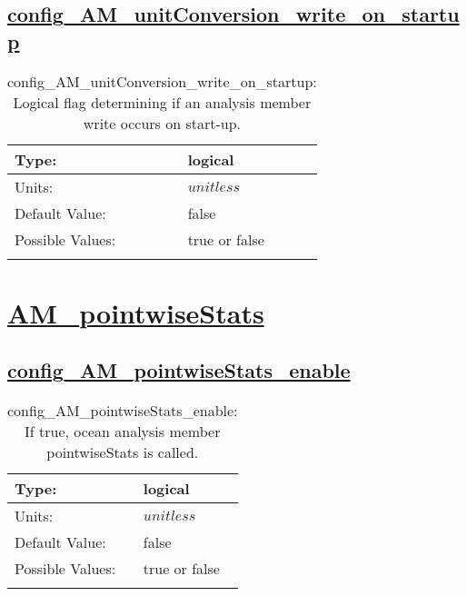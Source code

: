 \subsection[config\_AM\_unitConversion\_write\_on\_startup]{\hyperref[sec:nm_tab_AM_unitConversion]{config\_AM\_unitConversion\_write\_on\_startup}}
\label{subsec:nm_sec_config_AM_unitConversion_write_on_startup}
\begin{center}
\begin{longtable}{| p{2.0in} || p{4.0in} |}
    \hline
    Type: & logical \\
    \hline
    Units: & $unitless$ \\
    \hline
    Default Value: & false \\
    \hline
    Possible Values: & true or false \\
    \hline
    \caption{config\_AM\_unitConversion\_write\_on\_startup: Logical flag determining if an analysis member write occurs on start-up.}
\end{longtable}
\end{center}
\section[AM\_pointwiseStats]{\hyperref[sec:nm_tab_AM_pointwiseStats]{AM\_pointwiseStats}}
\label{sec:nm_sec_AM_pointwiseStats}
\subsection[config\_AM\_pointwiseStats\_enable]{\hyperref[sec:nm_tab_AM_pointwiseStats]{config\_AM\_pointwiseStats\_enable}}
\label{subsec:nm_sec_config_AM_pointwiseStats_enable}
\begin{center}
\begin{longtable}{| p{2.0in} || p{4.0in} |}
    \hline
    Type: & logical \\
    \hline
    Units: & $unitless$ \\
    \hline
    Default Value: & false \\
    \hline
    Possible Values: & true or false \\
    \hline
    \caption{config\_AM\_pointwiseStats\_enable: If true, ocean analysis member pointwiseStats is called.}
\end{longtable}
\end{center}
